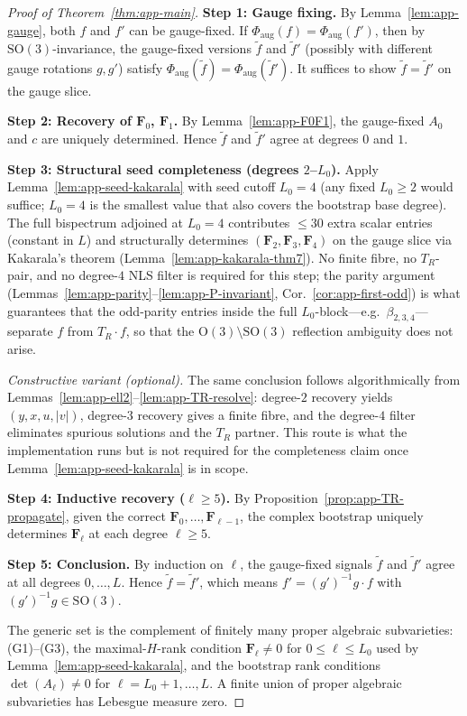 \documentclass{article}
\theoremstyle{definition}
\theoremstyle{remark}
\newcommand{\SO}{\mathrm{SO}}
\newcommand{\OG}{\mathrm{O}}
\theoremstyle{definition}
\begin{document}
\begin{proof}[Proof of Theorem~\ref{thm:app-main}]
\textbf{Step 1: Gauge fixing.}
By Lemma~\ref{lem:app-gauge}, both $f$ and $f'$ can be gauge-fixed.
If $\Phi_{\mathrm{aug}}(f) = \Phi_{\mathrm{aug}}(f')$, then by
$\SO(3)$-invariance, the gauge-fixed versions $\tilde{f}$ and $\tilde{f}'$
(possibly with different gauge rotations $g, g'$) satisfy
$\Phi_{\mathrm{aug}}(\tilde{f}) = \Phi_{\mathrm{aug}}(\tilde{f}')$.
It suffices to show $\tilde{f} = \tilde{f}'$ on the gauge slice.

\medskip
\textbf{Step 2: Recovery of $\mathbf{F}_0$, $\mathbf{F}_1$.}
By Lemma~\ref{lem:app-F0F1}, the gauge-fixed $A_0$ and $c$ are uniquely
determined. Hence $\tilde{f}$ and $\tilde{f}'$ agree at degrees $0$ and $1$.

\medskip
\textbf{Step 3: Structural seed completeness (degrees $2$--$L_0$).}
Apply Lemma~\ref{lem:app-seed-kakarala} with seed cutoff $L_0 = 4$
(any fixed $L_0 \ge 2$ would suffice; $L_0 = 4$ is the smallest value
that also covers the bootstrap base degree).  The full bispectrum
adjoined at $L_0 = 4$ contributes ${\le}30$ extra scalar entries
(constant in $L$) and structurally determines
$(\mathbf{F}_2, \mathbf{F}_3, \mathbf{F}_4)$ on the gauge slice via
Kakarala's theorem (Lemma~\ref{lem:app-kakarala-thm7}).  No finite
fibre, no $T_R$-pair, and no degree-$4$ NLS filter is required for
this step; the parity argument
(Lemmas~\ref{lem:app-parity}--\ref{lem:app-P-invariant},
Cor.~\ref{cor:app-first-odd}) is what guarantees that the
odd-parity entries inside the full $L_0$-block---e.g.\
$\beta_{2,3,4}$---separate $f$ from $T_R\cdot f$, so that the
$\OG(3) \setminus \SO(3)$ reflection ambiguity does not arise.

\medskip
\emph{Constructive variant (optional).}
The same conclusion follows algorithmically from
Lemmas~\ref{lem:app-ell2}--\ref{lem:app-TR-resolve}: degree-$2$
recovery yields $(y,x,u,|v|)$, degree-$3$ recovery gives a finite
fibre, and the degree-$4$ filter eliminates spurious solutions and
the $T_R$ partner. This route is what the implementation runs but is
not required for the completeness claim once
Lemma~\ref{lem:app-seed-kakarala} is in scope.

\medskip
\textbf{Step 4: Inductive recovery ($\ell \ge 5$).}
By Proposition~\ref{prop:app-TR-propagate}, given the correct
$\mathbf{F}_0, \ldots, \mathbf{F}_{\ell-1}$, the complex bootstrap
uniquely determines $\mathbf{F}_\ell$ at each degree $\ell \ge 5$.

\medskip
\textbf{Step 5: Conclusion.}
By induction on $\ell$, the gauge-fixed signals $\tilde{f}$ and $\tilde{f}'$
agree at all degrees $0, \ldots, L$.
Hence $\tilde{f} = \tilde{f}'$, which means $f' = (g')^{-1} g \cdot f$
with $(g')^{-1} g \in \SO(3)$.

The generic set is the complement of finitely many proper algebraic
subvarieties: (G1)--(G3), the maximal-$H$-rank condition
$\mathbf{F}_\ell \ne 0$ for $0 \le \ell \le L_0$ used by
Lemma~\ref{lem:app-seed-kakarala}, and the bootstrap rank conditions
$\det(A_\ell) \ne 0$ for $\ell = L_0{+}1, \ldots, L$.
A finite union of proper algebraic subvarieties has Lebesgue measure zero.
\end{proof}
\end{document}
